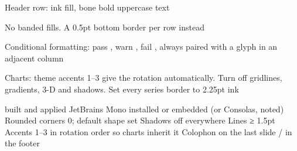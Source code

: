 \documentclass[fontpath=fonts/,logopath=logo/]{riposte-doc}
\begin{document}

\begin{ripbullets}
\item Header row: ink fill, bone bold uppercase text
\item No banded fills. A 0.5pt bottom border per row instead
\item Conditional formatting: pass , warn , fail , always paired with a  glyph in an adjacent column
\item Charts: theme accents 1–3 give the rotation automatically. Turn off gridlines, gradients, 3-D and shadows. Set every series border to 2.25pt ink
\end{ripbullets}



\begin{riptodolist}
\riptodo {} built and applied
\riptodo JetBrains Mono installed or embedded (or Consolas, noted)
\riptodo Rounded corners 0; default shape set
\riptodo Shadows off everywhere
\riptodo Lines ≥ 1.5pt
\riptodo Accents 1–3 in rotation order so charts inherit it
\riptodo Colophon on the last slide / in the footer
\end{riptodolist}

\ripend
\end{document}
